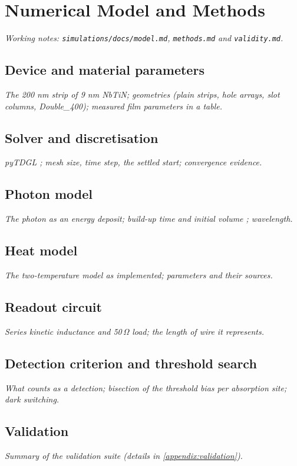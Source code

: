 \chapter{Numerical Model and Methods}
\label{chapter:methods}

\emph{Working notes: \texttt{simulations/docs/model.md}, \texttt{methods.md} and \texttt{validity.md}.}

\section{Device and material parameters}
\label{sec:me-device}
\emph{The 200 nm strip of 9 nm NbTiN; geometries (plain strips, hole arrays, slot columns, Double\_400);
measured film parameters \cite{sidorova2021,sidorova2022,jonsson2022} in a table.}

\section{Solver and discretisation}
\label{sec:me-solver}
\emph{pyTDGL \cite{bishopvanhorn2023}; mesh size, time step, the settled start; convergence evidence.}

\section{Photon model}
\label{sec:me-photon}
\emph{The photon as an energy deposit; build-up time and initial volume \cite{simon2025}; wavelength.}

\section{Heat model}
\label{sec:me-heat}
\emph{The two-temperature model as implemented; parameters and their sources.}

\section{Readout circuit}
\label{sec:me-circuit}
\emph{Series kinetic inductance and 50\,\unit{\ohm} load; the length of wire it represents.}

\section{Detection criterion and threshold search}
\label{sec:me-criterion}
\emph{What counts as a detection; bisection of the threshold bias per absorption site; dark switching.}

\section{Validation}
\label{sec:me-validation}
\emph{Summary of the validation suite (details in \cref{appendix:validation}).}
